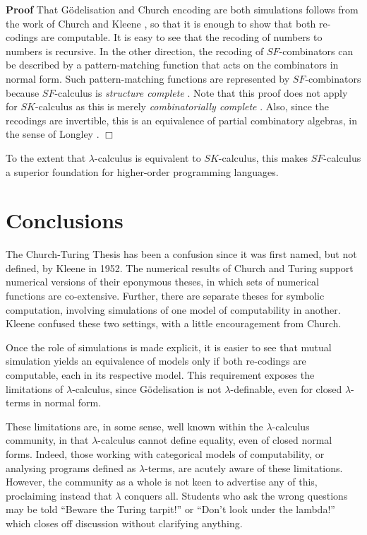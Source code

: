 \documentclass[a4paper]{article}
\newenvironment{proof}
	{\par\noindent\upshape\textbf{Proof}\quad}
	{\hspace*{\fill}$\Box$}
\begin{document}
\begin{proof}
  That G\"odelisation and Church encoding are both simulations follows
  from the work of Church \cite{Church36} and Kleene \cite{Kleene36},
  so that it is enough to show that both re-codings are computable. It
  is easy to see that the recoding of numbers to numbers is recursive.
  In the other direction, the recoding of $SF$-combinators can be
  described by a pattern-matching function that acts on the
  combinators in normal form.  Such pattern-matching functions are
  represented by $SF$-combinators because $SF$-calculus is {\em
    structure complete} \cite{JGW11}. Note that this proof does not
  apply for $SK$-calculus as this is merely {\em combinatorially
    complete} \cite{TRS}. Also, since the recodings are invertible,
  this is an equivalence of partial combinatory algebras, in the sense
  of Longley \cite{Longley14}.
\end{proof}

To the extent that $\lambda$-calculus is equivalent to $SK$-calculus, this
makes $SF$-calculus a superior foundation for higher-order programming
languages.



\section{Conclusions}
\label{sec:conclusions}

The Church-Turing Thesis has been a confusion since it was first
named, but not defined, by Kleene in 1952.  The numerical results of
Church and Turing support numerical versions of their eponymous theses, in which
sets of numerical functions are co-extensive. Further, there are
separate theses for symbolic computation, involving simulations of one
model of computability in another. Kleene confused these two
settings, with a little encouragement from Church.  

Once the role of simulations is made explicit, it is easier to see
that mutual simulation yields an equivalence of models only if both
re-codings are computable, each in its respective model. This
requirement exposes the limitations of $\lambda$-calculus, since
G\"odelisation is not $\lambda$-definable, even for closed $\lambda$-terms in
normal form.

These limitations are, in some sense, well known within the
$\lambda$-calculus community, in that $\lambda$-calculus cannot define equality,
even of closed normal forms. Indeed, those working with categorical
models of computability, or analysing programs defined as $\lambda$-terms,
are acutely aware of these limitations. However, the community as a
whole is not keen to advertise any of this, proclaiming instead that
$\lambda$ conquers all. Students who ask the wrong questions may be told
``Beware the Turing tarpit!''  \cite{Perlis82} or ``Don't look under
the lambda!''  which closes off discussion without clarifying anything.
\end{document}
